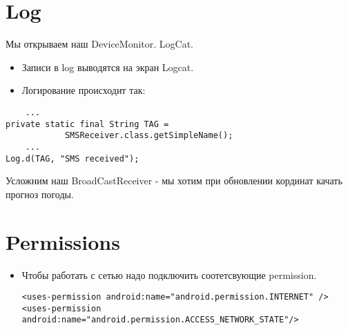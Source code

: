 \documentclass[12 pt]{article}
\begin{document}
\section{Log}
    Мы открываем наш DeviceMonitor. LogCat.     
    \begin{itemize}
        \item Записи в log выводятся на экран Logcat.
        \item Логирование происходит так:
    \end{itemize}
    \begin{lstlisting}
    ...
private static final String TAG = 
            SMSReceiver.class.getSimpleName();
    ...
Log.d(TAG, "SMS received");    
    \end{lstlisting}

Усложним наш BroadCastReceiver - мы хотим при обновлении кординат качать прогноз погоды.

\section{Permissions}
    \begin{itemize}
        \item Чтобы работать с сетью надо подключить соотетсвующие permission.
        \begin{lstlisting}
<uses-permission android:name="android.permission.INTERNET" /> 
<uses-permission  android:name="android.permission.ACCESS_NETWORK_STATE"/>        
        \end{lstlisting}
    \end{itemize}
\end{document}
